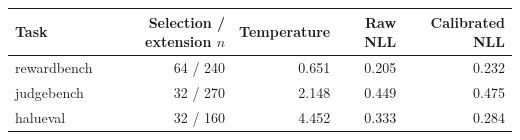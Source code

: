 \begin{tabular}{@{}lrrrr@{}}
\toprule
Task & Selection / extension $n$ & Temperature & Raw NLL & Calibrated NLL \\
\midrule
rewardbench & 64 / 240 & 0.651 & 0.205 & 0.232 \\
judgebench & 32 / 270 & 2.148 & 0.449 & 0.475 \\
halueval & 32 / 160 & 4.452 & 0.333 & 0.284 \\
\bottomrule
\end{tabular}
